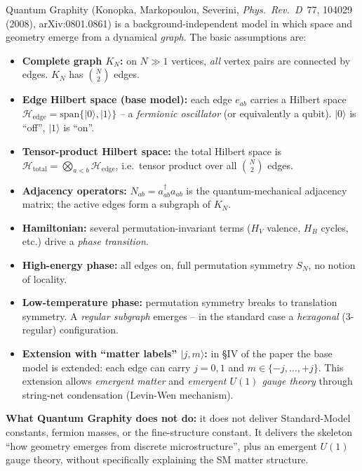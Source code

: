 Quantum Graphity (Konopka, Markopoulou, Severini, \emph{Phys.~Rev.~D}~77,
104029 (2008), arXiv:0801.0861) is a background-independent model in
which space and geometry emerge from a dynamical \emph{graph}. The
basic assumptions are:

\begin{itemize}[leftmargin=2em,itemsep=2pt,topsep=2pt]
  \item \textbf{Complete graph $K_N$:} on $N \gg 1$ vertices, \emph{all}
        vertex pairs are connected by edges. $K_N$ has $\binom{N}{2}$
        edges.
  \item \textbf{Edge Hilbert space (base model):} each edge $e_{ab}$
        carries a Hilbert space
        $\mathcal{H}_{\text{edge}} = \text{span}\{|0\rangle, |1\rangle\}$
        -- a \emph{fermionic oscillator} (or equivalently a qubit).
        $|0\rangle$ is \enquote{off}, $|1\rangle$ is \enquote{on}.
  \item \textbf{Tensor-product Hilbert space:} the total Hilbert
        space is
        $\mathcal{H}_{\text{total}} = \bigotimes_{a<b} \mathcal{H}_{\text{edge}}$,
        i.e.\ tensor product over all $\binom{N}{2}$ edges.
  \item \textbf{Adjacency operators:} $N_{ab} = a^\dagger_{ab} a_{ab}$
        is the quantum-mechanical adjacency matrix; the active edges
        form a subgraph of $K_N$.
  \item \textbf{Hamiltonian:} several permutation-invariant terms
        ($H_V$ valence, $H_B$ cycles, etc.) drive a \emph{phase
        transition}.
  \item \textbf{High-energy phase:} all edges on, full permutation
        symmetry $S_N$, no notion of locality.
  \item \textbf{Low-temperature phase:} permutation symmetry breaks
        to translation symmetry. A \emph{regular subgraph} emerges
        -- in the standard case a \emph{hexagonal}
        ($3$-regular) configuration.
  \item \textbf{Extension with \enquote{matter labels}
        $|j, m\rangle$:} in §IV of the paper the base model is
        extended: each edge can carry $j = 0, 1$ and
        $m \in \{-j, \ldots, +j\}$. This extension allows
        \emph{emergent matter} and \emph{emergent $U(1)$ gauge theory}
        through string-net condensation (Levin-Wen mechanism).
\end{itemize}

\textbf{What Quantum Graphity does not do:} it does not deliver
Standard-Model constants, fermion masses, or the fine-structure
constant. It delivers the skeleton \enquote{how geometry emerges
from discrete microstructure}, plus an emergent $U(1)$ gauge
theory, without specifically explaining the SM matter structure.

